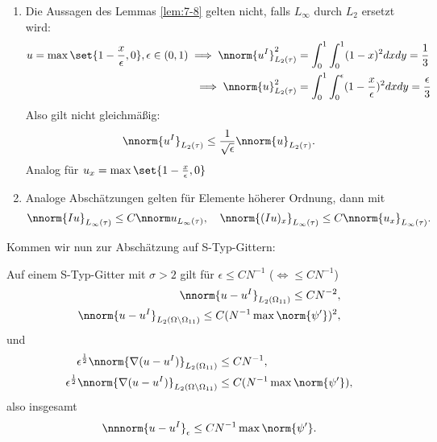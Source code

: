 \begin{bemerkung*}
  \begin{enumerate}
  \item 
  Die Aussagen des Lemmas \ref{lem:7-8} gelten nicht, falls $L_{\infty}$ durch $L_{2}$ ersetzt wird:
  \begin{align*}
    u = \max \set{ 1 - \frac x \epsilon, 0}, \epsilon \in (0, 1) \implies \nnorm{u^{I}}^{2}_{L_{2}(\tau)} &= \int_{0}^{1}\int_{0}^{1} (1 - x)^{2} dxdy = \frac 13\\
\implies \nnorm{u}^{2}_{L_{2}(\tau)} &= \int_{0}^{1}\int_{0}^{\epsilon} (1 - \frac x \epsilon)^{2} dxdy = \frac \epsilon 3
  \end{align*}
Also gilt nicht gleichmäßig:
\begin{align*}
  \nnorm{u^{I}} _{L_{2}(\tau)} \leq \frac 1 {\sqrt \epsilon}   \nnorm{u} _{L_{2}(\tau)}. 
\end{align*}
Analog für $u_{x} = \max \set{1 - \frac x \epsilon, 0}$
\item Analoge Abschätzungen gelten für Elemente höherer Ordnung, dann mit
  \begin{align*}
    \nnorm{Iu}_{L_{\infty}(\tau)} \leq C \nnorm u _{L_{\infty}(\tau)}, \quad     \nnorm{(Iu)_{x}}_{L_{\infty}(\tau)} \leq C \nnorm {u_{x}} _{L_{\infty}(\tau)}. 
  \end{align*}
  \end{enumerate}
\end{bemerkung*}
Kommen wir nun zur Abschätzung auf S-Typ-Gittern:
\begin{satz} \label{thm:7-9}
  Auf einem S-Typ-Gitter mit $\sigma > 2$ gilt für $\epsilon \leq CN^{-1}$ ($\iff \leq CN^{-1}$)
  \begin{align*}
    \nnorm{u - u^{I}}_{L_{2}(\Omega_{11})} \leq CN^{-2},\\
    \nnorm{u - u^{I}}_{L_{2}(\Omega\setminus\Omega_{11})} \leq C(N^{-1} \max \norm{\psi'})^{2},\\
  \end{align*}
und
\begin{align*}
  \epsilon^{\frac 12} \nnorm{\nabla(u - u^{I})}_{L_{2}(\Omega_{11})} &\leq C N^{-1},\\ 
  \epsilon^{\frac 12} \nnorm{\nabla(u - u^{I})}_{L_{2}(\Omega\setminus\Omega_{11})} &\leq C (N^{-1} \max \norm{\psi'}), 
\end{align*}
also insgesamt
\begin{align*}
  \nnnorm{u-u^{I}}_{\epsilon} \leq C N^{-1} \max \norm{\psi'}. 
\end{align*}
\end{satz}
